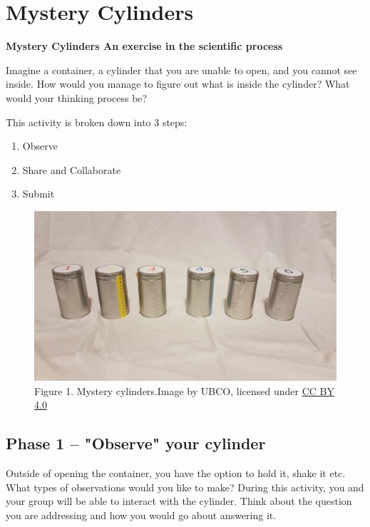\documentclass[
]{book}
\providecommand{\tightlist}{%
  \setlength{\itemsep}{0pt}\setlength{\parskip}{0pt}}
\begin{document}
\hypertarget{mystery-cylinders}{%
\chapter*{Mystery Cylinders}\label{mystery-cylinders}}

\textbf{Mystery Cylinders An exercise in the scientific process}

Imagine a container, a cylinder that you are unable to open, and you cannot see inside. How would you manage to figure out what is inside the cylinder? What would your thinking process be?

This activity is broken down into 3 steps:

\begin{enumerate}
\def\labelenumi{\arabic{enumi}.}
\tightlist
\item
  Observe
\item
  Share and Collaborate
\item
  Submit
\end{enumerate}

\begin{figure}
\centering
\includegraphics{figures_images/Lab2a-Fig1.jpg}
\caption{Figure 1. Mystery cylinders.Image by UBCO, licensed under \href{https://creativecommons.org/licenses/by/4.0/}{CC BY 4.0}}
\end{figure}

\hypertarget{phase-1-observe-your-cylinder}{%
\section*{Phase 1 -- "Observe" your cylinder}\label{phase-1-observe-your-cylinder}}

Outside of opening the container, you have the option to hold it, shake it etc. What types of observations would you like to make? During this activity, you and your group will be able to interact with the cylinder. Think about the question you are addressing and how you would go about answering it.
\end{document}
